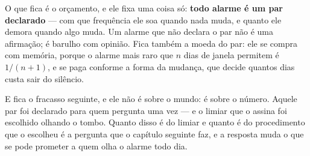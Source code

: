 O que fica é o orçamento, e ele fixa uma coisa só: \textbf{todo alarme é um par declarado} ---
com que frequência ele soa quando nada muda, e quanto ele demora quando algo muda. Um alarme que não declara o par não é uma afirmação; é barulho com opinião. Fica também
a moeda do par: ele se compra com memória, porque o alarme mais raro que $n$ dias de janela
permitem é $1/(n+1)$, e se paga conforme a forma da mudança, que decide quantos dias custa
sair do silêncio.

E fica o fracasso seguinte, e ele não é sobre o mundo: é sobre o número. Aquele par foi declarado
para quem pergunta uma vez --- e o limiar que o assina foi escolhido olhando o tombo. Quanto disso é
do limiar e quanto é do procedimento que o escolheu é a pergunta que o capítulo seguinte faz, e a
resposta muda o que se pode prometer a quem olha o alarme todo dia.
